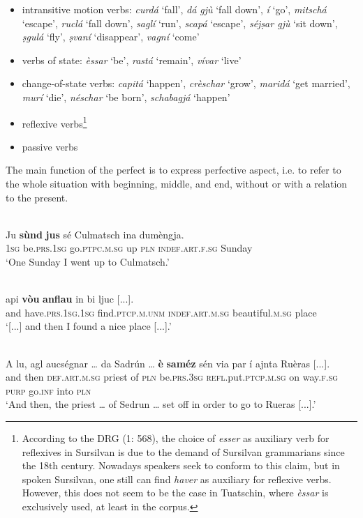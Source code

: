 \begin{itemize}
	
	\item intransitive motion verbs: \textit{curdá} `fall', \textit{dá gjù} `fall down', \textit{í} `go', \textit{mitschá} `escape', \textit{ruclá} `fall down', \textit{saglí} `run', \textit{scapá} `escape', \textit{séjṣar gjù} `sit down', \textit{ṣgulá} `fly', \textit{ṣvaní} `disappear', \textit{vagní} `come'
	\item verbs of state: \textit{èssar} `be', \textit{rastá} `remain', \textit{vívar} `live'
	\item change-of-state verbs: \textit{capitá} `happen',  \textit{crèschar} `grow', \textit{maridá} `get married', \textit{murí} `die', \textit{néschar} `be born', \textit{schabagjá} `happen'
	\item reflexive verbs\footnote{According to the DRG (1: 568), the choice of \textit{esser} as auxiliary verb for reflexives in Sursilvan is due to the demand of Sursilvan grammarians since the 18th century. Nowadays speakers seek to conform to this claim, but in spoken Sursilvan, one still can find \textit{haver} as auxiliary for reflexive verbs. However, this does not seem to be the case in Tuatschin, where \textit{èssar} is exclusively used, at least in the corpus.}
	\item passive verbs
	\end{itemize}

The main function of the perfect is to express perfective aspect, i.e. to refer to the whole situation with beginning, middle, and end, without or with a relation to the present.

\ea\label{}
\\
\gll    Ju \textbf{sùnd} \textbf{jus} sé Culmatsch ina dumèngja. \\
\textsc{1sg} be.\textsc{prs.1sg} go.\textsc{ptpc.m.sg} up \textsc{pln} \textsc{indef.art.f.sg} Sunday\\
\glt `One Sunday I went up to Culmatsch.'
\z

\ea
\label{}
\\
\gll  [...] api \textbf{vòu} \textbf{anflau} in bi ljuc [...].\\
 {} and have.\textsc{prs.1sg.1sg} find.\textsc{ptcp.m.unm} \textsc{indef.art.m.sg} beautiful.\textsc{m.sg} place\\
\glt `[...] and then I found a nice place [...].'
\z

\ea\label{}
\\
\gll    A lu, agl aucségnar … da Sadrún … \textbf{è} \textbf{saméz} sén via par í ajnta Ruèras [...].\\
and then \textsc{def.art.m.sg} priest {} of \textsc{pln} {} be.\textsc{prs.3sg} \textsc{refl.}put.\textsc{ptcp.m.sg} on way.\textsc{f.sg} \textsc{purp} go.\textsc{inf} into \textsc{pln}\\
\glt `And then, the priest … of Sedrun … set off in order to go to Rueras [...].'
\z

